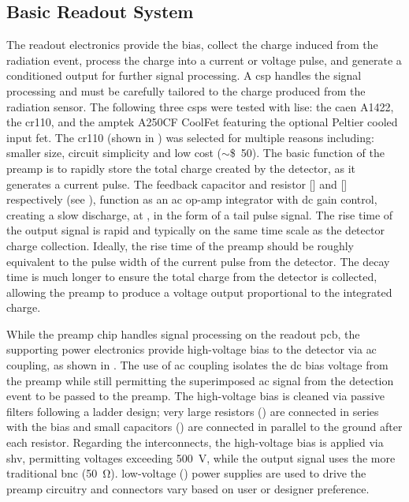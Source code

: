 \documentclass[../../../main.tex]{subfiles}
\begin{document}
%
    \subsection{Basic Readout System}%
    \label{sec:chapter-3:early-designs:basic-readout}%
    The readout electronics provide the bias, collect the charge induced from the radiation event, process the charge into a current or voltage pulse, and generate a conditioned output for further signal processing.
    A \gls{csp} handles the signal processing and must be carefully tailored to the charge produced from the radiation sensor.
    The following three \glspl{csp} were tested with \gls{lise}: the \gls{caen} A1422, the \gls{cr110}, and the \gls{amptek} A250CF CoolFet featuring the optional Peltier cooled input \gls{fet}.
    The \gls{cr110} (shown in ) was selected for multiple reasons including: smaller size, circuit simplicity and low cost ($\sim$\SI{50}[\$]{}).
    The basic function of the \gls{preamp} is to rapidly store the total charge created by the detector, as it generates a current pulse.
    The feedback capacitor and resistor [] and [] respectively (see ), function as an \gls{ac} op-amp integrator with \gls{dc} gain control, creating a slow discharge, at , in the form of a tail pulse signal.
    The rise time of the output signal is rapid and typically on the same time scale as the detector charge collection.
    Ideally, the rise time of the \gls{preamp} should be roughly equivalent to the pulse width of the current pulse from the detector.
    The decay time is much longer to ensure the total charge from the detector is collected, allowing the \gls{preamp} to produce a voltage output proportional to the integrated charge.   
    \par%
    While the \gls{preamp} chip handles signal processing on the readout \gls{pcb}, the supporting power electronics provide \gls{high-voltage} bias to the detector via \gls{ac} coupling, as shown in .
    The use of \gls{ac} coupling isolates the \gls{dc} bias voltage from the \gls{preamp} while still permitting the superimposed \gls{ac} signal from the detection event to be passed to the \gls{preamp}.
    The \gls{high-voltage} bias is cleaned via passive filters following a ladder design; very large resistors () are connected in series with the bias and small capacitors () are connected in parallel to the ground after each resistor.
    Regarding the interconnects, the \gls{high-voltage} bias is applied via \gls{shv}, permitting voltages exceeding \SI{500}{\volt}, while the output signal uses the more traditional \gls{bnc} (\SI{50}{\ohm}).
    \Gls{low-voltage} () power supplies are used to drive the \gls{preamp} circuitry and connectors vary based on user or designer preference.
\end{document}
